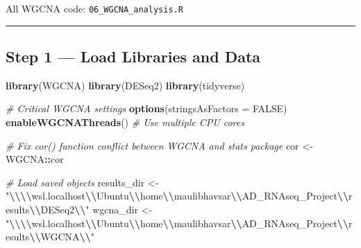 \documentclass[
]{article}
\newenvironment{Shaded}{\begin{snugshade}}{\end{snugshade}}
\newcommand{\AttributeTok}[1]{\textcolor[rgb]{0.13,0.29,0.53}{#1}}
\newcommand{\CommentTok}[1]{\textcolor[rgb]{0.56,0.35,0.01}{\textit{#1}}}
\newcommand{\ConstantTok}[1]{\textcolor[rgb]{0.56,0.35,0.01}{#1}}
\newcommand{\FunctionTok}[1]{\textcolor[rgb]{0.13,0.29,0.53}{\textbf{#1}}}
\newcommand{\NormalTok}[1]{#1}
\newcommand{\OtherTok}[1]{\textcolor[rgb]{0.56,0.35,0.01}{#1}}
\newcommand{\SpecialCharTok}[1]{\textcolor[rgb]{0.81,0.36,0.00}{\textbf{#1}}}
\newcommand{\StringTok}[1]{\textcolor[rgb]{0.31,0.60,0.02}{#1}}
\begin{document}
All WGCNA code: \texttt{06\_WGCNA\_analysis.R}

\begin{center}\rule{0.5\linewidth}{0.5pt}\end{center}

\subsection{Step 1 --- Load Libraries and
Data}\label{step-1-load-libraries-and-data}

\begin{Shaded}
\begin{Highlighting}[]
\FunctionTok{library}\NormalTok{(WGCNA)}
\FunctionTok{library}\NormalTok{(DESeq2)}
\FunctionTok{library}\NormalTok{(tidyverse)}

\CommentTok{\# Critical WGCNA settings}
\FunctionTok{options}\NormalTok{(}\AttributeTok{stringsAsFactors =} \ConstantTok{FALSE}\NormalTok{)}
\FunctionTok{enableWGCNAThreads}\NormalTok{()  }\CommentTok{\# Use multiple CPU cores}

\CommentTok{\# Fix cor() function conflict between WGCNA and stats package}
\NormalTok{cor }\OtherTok{\textless{}{-}}\NormalTok{ WGCNA}\SpecialCharTok{::}\NormalTok{cor}

\CommentTok{\# Load saved objects}
\NormalTok{results\_dir }\OtherTok{\textless{}{-}} \StringTok{"}\SpecialCharTok{\textbackslash{}\textbackslash{}\textbackslash{}\textbackslash{}}\StringTok{wsl.localhost}\SpecialCharTok{\textbackslash{}\textbackslash{}}\StringTok{Ubuntu}\SpecialCharTok{\textbackslash{}\textbackslash{}}\StringTok{home}\SpecialCharTok{\textbackslash{}\textbackslash{}}\StringTok{maulibhavsar}\SpecialCharTok{\textbackslash{}\textbackslash{}}\StringTok{AD\_RNAseq\_Project}\SpecialCharTok{\textbackslash{}\textbackslash{}}\StringTok{results}\SpecialCharTok{\textbackslash{}\textbackslash{}}\StringTok{DESeq2}\SpecialCharTok{\textbackslash{}\textbackslash{}}\StringTok{"}
\NormalTok{wgcna\_dir   }\OtherTok{\textless{}{-}} \StringTok{"}\SpecialCharTok{\textbackslash{}\textbackslash{}\textbackslash{}\textbackslash{}}\StringTok{wsl.localhost}\SpecialCharTok{\textbackslash{}\textbackslash{}}\StringTok{Ubuntu}\SpecialCharTok{\textbackslash{}\textbackslash{}}\StringTok{home}\SpecialCharTok{\textbackslash{}\textbackslash{}}\StringTok{maulibhavsar}\SpecialCharTok{\textbackslash{}\textbackslash{}}\StringTok{AD\_RNAseq\_Project}\SpecialCharTok{\textbackslash{}\textbackslash{}}\StringTok{results}\SpecialCharTok{\textbackslash{}\textbackslash{}}\StringTok{WGCNA}\SpecialCharTok{\textbackslash{}\textbackslash{}}\StringTok{"}


\end{Highlighting}
\end{Shaded}
\end{document}
